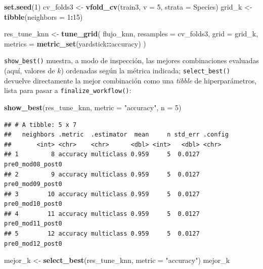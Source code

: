 \documentclass[
]{book}
\newenvironment{Shaded}{\begin{snugshade}}{\end{snugshade}}
\newcommand{\AttributeTok}[1]{\textcolor[rgb]{0.13,0.29,0.53}{#1}}
\newcommand{\DecValTok}[1]{\textcolor[rgb]{0.00,0.00,0.81}{#1}}
\newcommand{\FunctionTok}[1]{\textcolor[rgb]{0.13,0.29,0.53}{\textbf{#1}}}
\newcommand{\NormalTok}[1]{#1}
\newcommand{\OtherTok}[1]{\textcolor[rgb]{0.56,0.35,0.01}{#1}}
\newcommand{\SpecialCharTok}[1]{\textcolor[rgb]{0.81,0.36,0.00}{\textbf{#1}}}
\newcommand{\StringTok}[1]{\textcolor[rgb]{0.31,0.60,0.02}{#1}}
\theoremstyle{break}
\theoremstyle{nonumberplain}
\begin{document}
\begin{Shaded}
\begin{Highlighting}[]
\FunctionTok{set.seed}\NormalTok{(}\DecValTok{1}\NormalTok{)}
\NormalTok{cv\_folds3 }\OtherTok{\textless{}{-}} \FunctionTok{vfold\_cv}\NormalTok{(train3, }\AttributeTok{v =} \DecValTok{5}\NormalTok{, }\AttributeTok{strata =}\NormalTok{ Species)}
\NormalTok{grid\_k }\OtherTok{\textless{}{-}} \FunctionTok{tibble}\NormalTok{(}\AttributeTok{neighbors =} \DecValTok{1}\SpecialCharTok{:}\DecValTok{15}\NormalTok{)}

\NormalTok{res\_tune\_knn }\OtherTok{\textless{}{-}} \FunctionTok{tune\_grid}\NormalTok{(}
\NormalTok{  flujo\_knn,}
  \AttributeTok{resamples =}\NormalTok{ cv\_folds3,}
  \AttributeTok{grid =}\NormalTok{ grid\_k,}
  \AttributeTok{metrics =} \FunctionTok{metric\_set}\NormalTok{(yardstick}\SpecialCharTok{::}\NormalTok{accuracy)}
\NormalTok{)}
\end{Highlighting}
\end{Shaded}

\texttt{show\_best()} muestra, a modo de inspección, las mejores combinaciones evaluadas (aquí, valores de \(k\)) ordenadas según la métrica indicada; \texttt{select\_best()} devuelve directamente la mejor combinación como una \emph{tibble} de hiperparámetros, lista para pasar a \texttt{finalize\_workflow()}:

\begin{Shaded}
\begin{Highlighting}[]
\FunctionTok{show\_best}\NormalTok{(res\_tune\_knn, }\AttributeTok{metric =} \StringTok{"accuracy"}\NormalTok{, }\AttributeTok{n =} \DecValTok{5}\NormalTok{)}
\end{Highlighting}
\end{Shaded}

\begin{verbatim}
## # A tibble: 5 x 7
##   neighbors .metric  .estimator  mean     n std_err .config         
##       <int> <chr>    <chr>      <dbl> <int>   <dbl> <chr>           
## 1         8 accuracy multiclass 0.959     5  0.0127 pre0_mod08_post0
## 2         9 accuracy multiclass 0.959     5  0.0127 pre0_mod09_post0
## 3        10 accuracy multiclass 0.959     5  0.0127 pre0_mod10_post0
## 4        11 accuracy multiclass 0.959     5  0.0127 pre0_mod11_post0
## 5        12 accuracy multiclass 0.959     5  0.0127 pre0_mod12_post0
\end{verbatim}

\begin{Shaded}
\begin{Highlighting}[]
\NormalTok{mejor\_k }\OtherTok{\textless{}{-}} \FunctionTok{select\_best}\NormalTok{(res\_tune\_knn, }\AttributeTok{metric =} \StringTok{"accuracy"}\NormalTok{)}
\NormalTok{mejor\_k}
\end{Highlighting}
\end{Shaded}
\end{document}
